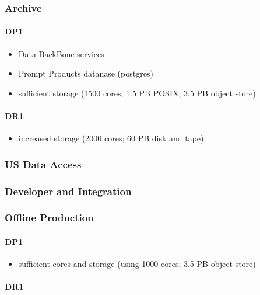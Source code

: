 \subsubsection{Archive}

\paragraph{DP1}

\begin{itemize}
\item Data BackBone services
\item Prompt Products datanase (postgres)
 \item sufficient storage (1500 cores; 1.5 PB POSIX, 3.5 PB object store)
 \end{itemize}

 \paragraph{DR1}
 

 \begin{itemize}
 \item increased storage (2000 cores; 60 PB disk and tape)
 \end{itemize}
 
\subsubsection{US Data Access}

\subsubsection{Developer and Integration}

\subsubsection{Offline Production}

\paragraph{DP1}

\begin{itemize}
 \item sufficient cores and storage (using 1000 cores; 3.5 PB object store)
 \end{itemize}

 \paragraph{DR1}